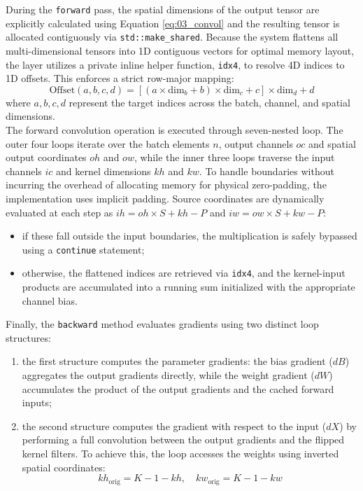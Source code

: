 During the \texttt{forward} pass, the spatial dimensions of the output tensor are explicitly calculated using Equation \eqref{eq:03_convol} and the resulting tensor is allocated contiguously via \texttt{std::make\_shared}. Because the system flattens all multi-dimensional tensors into 1D contiguous vectors for optimal memory layout, the layer utilizes a private inline helper function, \texttt{idx4}, to resolve 4D indices to 1D offsets. This enforces a strict row-major mapping:
\begin{equation}
    \text{Offset}(a, b, c, d) = \left[ \left( a \times \text{dim}_b + b \right) \times \text{dim}_c + c \right] \times \text{dim}_d + d
\end{equation}
where $a, b, c, d$ represent the target indices across the batch, channel, and spatial dimensions.\\

The forward convolution operation is executed through seven-nested loop. The outer four loops iterate over the batch elements $n$, output channels $oc$ and spatial output coordinates $oh$ and $ow$, while the inner three loops traverse the input channels $ic$ and kernel dimensions $kh$ and $kw$. To handle boundaries without incurring the overhead of allocating memory for physical zero-padding, the implementation uses implicit padding. Source coordinates are dynamically evaluated at each step as $ih = oh \times S + kh - P$ and $iw = ow \times S + kw - P$:
\begin{itemize}
    \item[-] if these fall outside the input boundaries, the multiplication is safely bypassed using a \texttt{continue} statement;
    \item[-] otherwise, the flattened indices are retrieved via \texttt{idx4}, and the kernel-input products are accumulated into a running sum initialized with the appropriate channel bias.
\end{itemize}
\vspace{2ex}

Finally, the \texttt{backward} method evaluates gradients using two distinct loop structures:
\begin{enumerate}
    \item[-] the first structure computes the parameter gradients: the bias gradient ($dB$) aggregates the output gradients directly, while the weight gradient ($dW$) accumulates the product of the output gradients and the cached forward inputs;
    \item[-] the second structure computes the gradient with respect to the input ($dX$) by performing a full convolution between the output gradients and the flipped kernel filters. To achieve this, the loop accesses the weights using inverted spatial coordinates:
    \begin{equation}
        kh_{\text{orig}} = K - 1 - kh, \quad kw_{\text{orig}} = K - 1 - kw
    \end{equation}
\end{enumerate}

